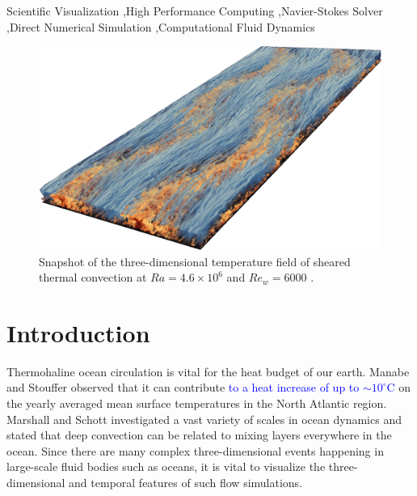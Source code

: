 \documentclass[5p,times]{elsarticle}
\begin{document}
\begin{frontmatter}
\begin{abstract}
\end{abstract}

\begin{keyword}

Scientific Visualization \sep High Performance Computing \sep Navier-Stokes Solver \sep Direct Numerical Simulation \sep Computational Fluid Dynamics

\end{keyword}

\end{frontmatter}


\begin{figure}[!hbt]
	\centering
	\includegraphics[width=\linewidth]{flowfield}%
	\caption{\label{fig:flowfield} Snapshot of the three-dimensional temperature field of sheared thermal convection at $ Ra=4.6 \times 10^6 $ and $ Re_w=6000 $ \cite{bla19}.}
\end{figure}

\section{Introduction}
\label{sec:Introduction}

Thermohaline ocean circulation \cite{rah00} is vital for the heat budget of our earth. Manabe and Stouffer \cite{man88} observed that it can contribute \textcolor{blue}{to a heat increase of up to $ \sim 10 ^ \circ $C} on the yearly averaged mean surface temperatures in the North Atlantic region. Marshall and Schott \cite{mar99} investigated a vast variety of scales in ocean dynamics and stated that deep convection can be related to mixing layers everywhere in the ocean. Since there are many complex three-dimensional events happening in large-scale fluid bodies such as oceans, it is vital to visualize the three-dimensional and temporal features of such flow simulations.
\end{document}
